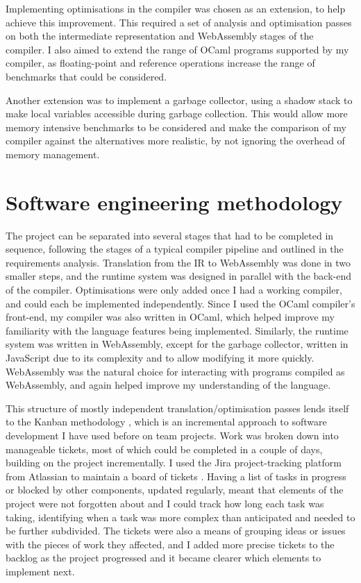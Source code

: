 Implementing optimisations in the compiler was chosen as an extension, to help achieve this improvement. This required a set of analysis and optimisation passes on both the intermediate representation and WebAssembly stages of the compiler. I also aimed to extend the range of OCaml programs supported by my compiler, as floating-point and reference operations increase the range of benchmarks that could be considered. %

Another extension was to implement a garbage collector, using a shadow stack to make local variables accessible during garbage collection. This would allow more memory intensive benchmarks to be considered and make the comparison of my compiler against the alternatives more realistic, by not ignoring the overhead of memory management. %



\section{Software engineering methodology}

The project can be separated into several stages that had to be completed in sequence, following the stages of a typical compiler pipeline and outlined in the requirements analysis. Translation from the IR to WebAssembly was done in two smaller steps, and the runtime system was designed in parallel with the back-end of the compiler. Optimisations were only added once I had a working compiler, and could each be implemented independently. Since I used the OCaml compiler's front-end, my compiler was also written in OCaml, which helped improve my familiarity with the language features being implemented. Similarly, the runtime system was written in WebAssembly, except for the garbage collector, written in JavaScript due to its complexity and to allow modifying it more quickly. WebAssembly was the natural choice for interacting with programs compiled as WebAssembly, and again helped improve my understanding of the language.

This structure of mostly independent translation/optimisation passes lends itself to the Kanban methodology \cite{kanban}, which is an incremental approach to software development I have used before on team projects. Work was broken down into manageable tickets, most of which could be completed in a couple of days, building on the project incrementally. I used the Jira project-tracking platform from Atlassian to maintain a board of tickets \cite{jira}. Having a list of tasks in progress or blocked by other components, updated regularly, meant that elements of the project were not forgotten about and I could track how long each task was taking, identifying when a task was more complex than anticipated and needed to be further subdivided. The tickets were also a means of grouping ideas or issues with the pieces of work they affected, and I added more precise tickets to the backlog as the project progressed and it became clearer which elements to implement next.

